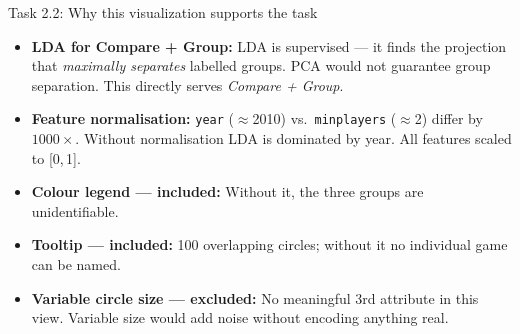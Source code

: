 \documentclass[aspectratio=169, 11pt]{beamer}
\begin{document}
\begin{frame}[t]{Task 2.2: Why this visualization supports the task}

\begin{itemize}\setlength\itemsep{8pt}
  \item \textbf{LDA for Compare + Group:} LDA is supervised — it finds the projection that \textit{maximally separates} labelled groups. PCA would not guarantee group separation. This directly serves \textit{Compare + Group}.

  \item \textbf{Feature normalisation:} \texttt{year} ($\approx$2010) vs.\ \texttt{minplayers} ($\approx$2) differ by $1000\times$. Without normalisation LDA is dominated by year. All features scaled to [0,\,1].

  \item \textbf{Colour legend — included:} Without it, the three groups are unidentifiable.

  \item \textbf{Tooltip — included:} 100 overlapping circles; without it no individual game can be named.

  \item \textbf{Variable circle size — excluded:} No meaningful 3rd attribute in this view. Variable size would add noise without encoding anything real.
\end{itemize}

\end{frame}
\end{document}
